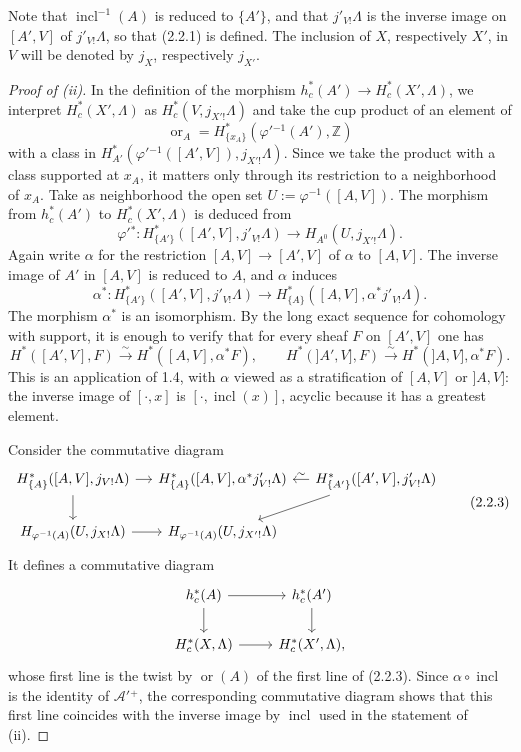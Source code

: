 \documentclass[11pt]{article}
\theoremstyle{definition}
\newcommand{\ZZ}{\mathbb Z}
\newcommand{\ornt}{\operatorname{or}}
\newcommand{\incl}{\operatorname{incl}}
\begin{document}
Note that $\incl^{-1}(A)$ is reduced to $\{A'\}$, and that $j'_{V!}\Lambda$ is the inverse image on $[A',V]$ of $j'_{V!}\Lambda$, so that (2.2.1) is defined.  The inclusion of $X$, respectively $X'$, in $V$ will be denoted by $j_X$, respectively $j_{X'}$.

\begin{proof}[Proof of (ii)]
In the definition of the morphism $h_c^*(A')\to H_c^*(X',\Lambda)$, we interpret $H_c^*(X',\Lambda)$ as $H_c^*(V,j_{X'!}\Lambda)$ and take the cup product of an element of
\[
\ornt_A=H^*_{\{x_A\}}(\varphi'{}^{-1}(A'),\ZZ)
\]
with a class in $H^*_{A'}(\varphi'{}^{-1}([A',V]),j_{X'!}\Lambda)$.  Since we take the product with a class supported at $x_A$, it matters only through its restriction to a neighborhood of $x_A$.  Take as neighborhood the open set $U:=\varphi^{-1}([A,V])$.  The morphism from $h_c^*(A')$ to $H_c^*(X',\Lambda)$ is deduced from
\[
\varphi'{}^*:H^*_{\{A'\}}([A',V],j'_{V!}\Lambda)\to H_{A^0}(U,j_{X'!}\Lambda).
\]
Again write $\alpha$ for the restriction $[A,V]\to[A',V]$ of $\alpha$ to $[A,V]$.  The inverse image of $A'$ in $[A,V]$ is reduced to $A$, and $\alpha$ induces
\begin{equation}
\alpha^*:H^*_{\{A'\}}([A',V],j'_{V!}\Lambda)\to H^*_{\{A\}}([A,V],\alpha^*j'_{V!}\Lambda).\tag{2.2.2}
\end{equation}
The morphism $\alpha^*$ is an isomorphism.  By the long exact sequence for cohomology with support, it is enough to verify that for every sheaf $F$ on $[A',V]$ one has
\[
H^*([A',V],F)\xrightarrow{\sim}H^*([A,V],\alpha^*F),
\qquad
H^*(]A',V],F)\xrightarrow{\sim}H^*(]A,V],\alpha^*F).
\]
This is an application of 1.4, with $\alpha$ viewed as a stratification of $[A,V]$ or $]A,V]$: the inverse image of $[\cdot,x]$ is $[\cdot,\incl(x)]$, acyclic because it has a greatest element.

Consider the commutative diagram
\begin{equation}
\begin{tikzcd}[column sep=small]
H^*_{\{A\}}([A,V],j_{V!}\Lambda) \arrow[r] \arrow[d] & H^*_{\{A\}}([A,V],\alpha^*j'_{V!}\Lambda) & H^*_{\{A'\}}([A',V],j'_{V!}\Lambda) \arrow[l,"\sim"'] \arrow[dl] \\
H_{\varphi^{-1}(A)}(U,j_{X!}\Lambda) \arrow[r] & H_{\varphi^{-1}(A)}(U,j_{X'!}\Lambda) &
\end{tikzcd}\tag{2.2.3}
\end{equation}
It defines a commutative diagram
\[
\begin{tikzcd}
h_c^*(A) \arrow[r] \arrow[d] & h_c^*(A') \arrow[d]\\
H_c^*(X,\Lambda) \arrow[r] & H_c^*(X',\Lambda),
\end{tikzcd}
\]
whose first line is the twist by $\ornt(A)$ of the first line of (2.2.3).  Since $\alpha\circ\incl$ is the identity of $\mathcal A'{}^+$, the corresponding commutative diagram shows that this first line coincides with the inverse image by $\incl$ used in the statement of (ii).
\end{proof}
\end{document}

